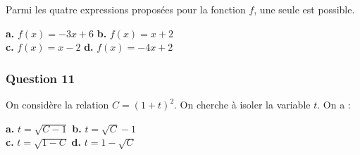 Parmi les quatre expressions proposées pour la fonction $f$, une seule est possible.

\textbf{a.} $f(x) = -3x + 6$ \hfill \textbf{b.} $f(x) = x + 2$ \\
\textbf{c.} $f(x) = x - 2$ \hfill \textbf{d.} $f(x) = -4x + 2$

\subsubsection*{Question 11}
On considère la relation $C = (1 + t)^2$. On cherche à isoler la variable $t$. On a :

\textbf{a.} $t = \sqrt{C - 1}$ \hfill \textbf{b.} $t = \sqrt{C} - 1$ \\
\textbf{c.} $t = \sqrt{1 - C}$ \hfill \textbf{d.} $t = 1 - \sqrt{C}$

\bigskip

